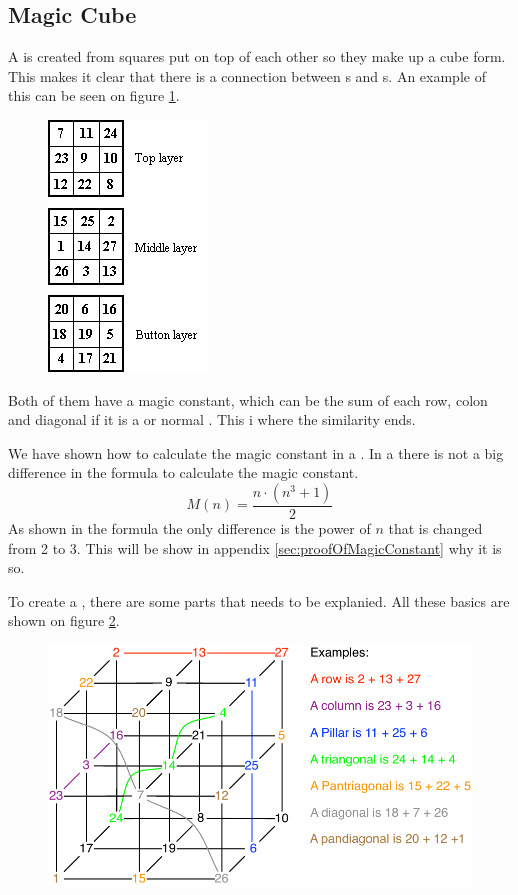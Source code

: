 \subsection{Magic Cube}
A \mcube{} is created from squares put on top of each other so they make up a cube form. 
This makes it clear that there is a connection between \msquare{}s and  \mcube{}s.
An example of this can be seen on figure \ref{fig:presentMagicCube}.

\begin{figure}[h]
	\centering
		\includegraphics[scale=0.8]{input/pics/presentMagicCube}
	\caption{}
	\label{fig:presentMagicCube}
\end{figure}

Both of them have a magic constant, which can be the sum of each row, colon and diagonal if it is a  \mcube{} or normal \msquare{}.
This i where the similarity ends.

We have shown how to calculate the magic constant in a \msquare{}.
In a  \mcube{} there is not a big difference in the formula to calculate the magic constant.
\begin{equation}
	M(n)=\frac{n \cdot (n^3+1)}{2}
\end{equation}
As shown in the formula the only difference is the power of $n$ that is changed from 2 to 3.
This will be show in appendix \ref{sec:proofOfMagicConstant} why it is so.

To create a  \mcube{}, there are some parts that needs to be explanied.
All these basics are shown on figure \ref{fig:cubeparts}.

\begin{figure}[h]
	\centering
		\includegraphics[scale=0.3]{input/pics/cubeparts}
	\caption{}
	\label{fig:cubeparts}
\end{figure}

